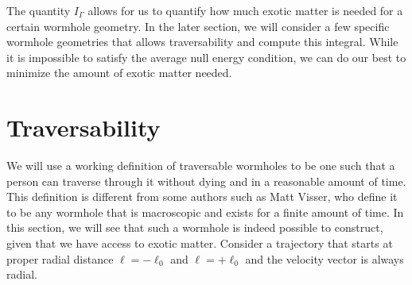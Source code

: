 \documentclass[%
 reprint,
 amsmath,amssymb
 aps,
]{revtex4}
\theoremstyle{remark}
\begin{document}
The quantity $I_{\Gamma}$ allows for us to quantify how much exotic matter is needed for a certain wormhole geometry. In the later section, we will consider a few specific wormhole geometries that allows traversability and compute this integral. While it is impossible to satisfy the average null energy condition, we can do our best to minimize the amount of exotic matter needed.

\section{Traversability}
We will use a working definition of traversable wormholes to be one such that a person can traverse through it without dying and in a reasonable amount of time. This definition is different from some authors such as Matt Visser, who define it to be any wormhole that is macroscopic and exists for a finite amount of time. In this section, we will see that such a wormhole is indeed possible to construct, given that we have access to exotic matter. Consider a trajectory that starts at proper radial distance $\ell = -\ell_0$ and $\ell = +\ell_0$ and the velocity vector is always radial.
\end{document}
